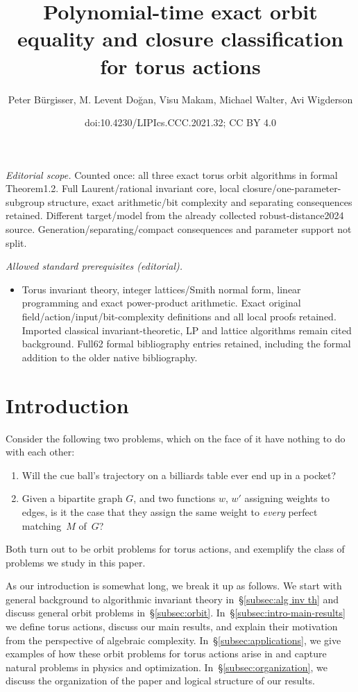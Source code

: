 \documentclass[10pt,a4paper]{article}
\title{Polynomial-time exact orbit equality and closure classification for torus actions}
\author{Peter Bürgisser, M. Levent Doğan, Visu Makam, Michael Walter, Avi Wigderson}
\date{doi:10.4230/LIPIcs.CCC.2021.32; CC BY 4.0}
\theoremstyle{definition}
\numberwithin{equation}{section}
\begin{document}
\maketitle
\noindent\textit{Editorial scope.} Counted once: all three exact torus orbit algorithms in formal Theorem1.2. Full Laurent/rational invariant core, local closure/one-parameter-subgroup structure, exact arithmetic/bit complexity and separating consequences retained. Different target/model from the already collected robust-distance2024 source. Generation/separating/compact consequences and parameter support not split.\par\medskip
\noindent\textit{Allowed standard prerequisites (editorial).}\begin{itemize}
\item Torus invariant theory, integer lattices/Smith normal form, linear programming and exact power-product arithmetic. Exact original field/action/input/bit-complexity definitions and all local proofs retained. Imported classical invariant-theoretic, LP and lattice algorithms remain cited background. Full62 formal bibliography entries retained, including the formal addition to the older native bibliography.
\end{itemize}\medskip
\section{Introduction} \label{sec:intro}
%
Consider the following two problems, which on the face of it have nothing to do with each other:
\begin{enumerate}
\item Will the cue ball's trajectory on a billiards table ever end up in a pocket?
\item Given a bipartite graph $G$, and two functions $w$, $w'$ assigning weights to edges, is it the case that they assign the same weight to \emph{every} perfect matching~$M$ of~$G$?
\end{enumerate}
Both turn out to be orbit problems for torus actions, and exemplify the class of problems we study in this paper.

As our introduction is somewhat long, we break it up as follows.
We start with general background to algorithmic invariant theory in~\S\ref{subsec:alg inv th} and discuss general orbit problems in~\S\ref{subsec:orbit}.
In~\S\ref{subsec:intro-main-results} we define torus actions, discuss our main results, and explain their motivation
from the perspective of algebraic complexity.
In~\S\ref{subsec:applications}, we give examples of how these orbit problems for torus actions arise in and capture natural problems in physics and optimization.
In~\S\ref{subsec:organization}, we discuss the organization of the paper and logical structure of our results.
\end{document}

